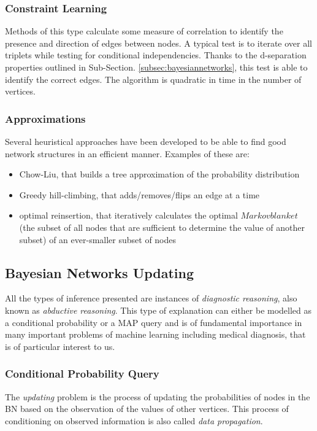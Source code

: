 \subsubsection{Constraint Learning}
Methods of this type calculate some measure of correlation to identify the presence and direction of edges between nodes.
A typical test is to iterate over all triplets while testing for conditional independencies.
Thanks to the d-separation properties outlined in Sub-Section. \ref{subsec:bayesiannetworks}, this test is able to identify the correct edges.
The algorithm is quadratic in time in the number of vertices.

\subsubsection{Approximations}
Several heuristical approaches have been developed to be able to find good network structures in an efficient manner.
Examples of these are:
\begin{itemize}
  \item Chow-Liu, that builds a tree approximation of the probability distribution
  \item Greedy hill-climbing, that adds/removes/flips an edge at a time
  \item optimal reinsertion, that iteratively calculates the optimal $Markov blanket$ (the subset of all nodes that are sufficient to determine the value of another subset) of an ever-smaller subset of nodes
\end{itemize}

\subsection{Bayesian Networks Updating} \label{subsec:bnupdating}
All the types of inference presented are instances of \textit{diagnostic reasoning}, also known as \textit{abductive reasoning}.  
This type of explanation can either be modelled as a conditional probability or a MAP query and is of fundamental importance in many important problems of machine learning including medical diagnosis, that is of particular interest to us.

\subsubsection{Conditional Probability Query}
The \textit{updating} problem is the process of updating the probabilities of nodes in the BN based on the observation of the values of other vertices.
This process of conditioning on observed information is also called \textit{data propagation}.

